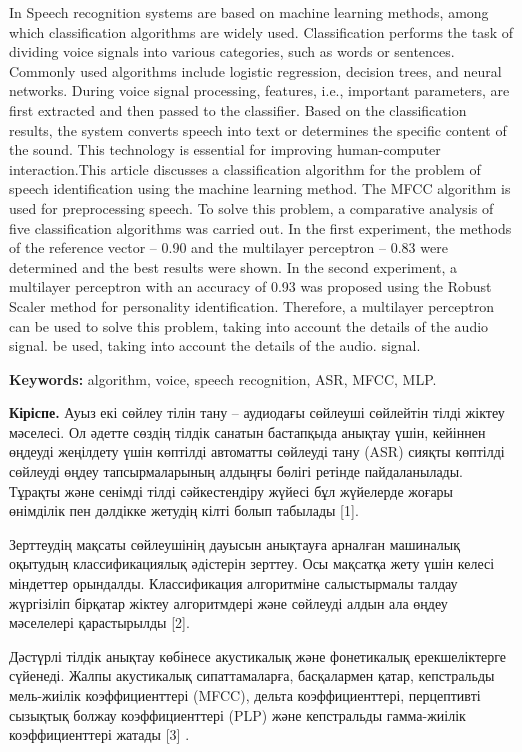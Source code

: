 In Speech recognition systems are based on machine learning methods,
among which classification algorithms are widely used. Classification
performs the task of dividing voice signals into various categories,
such as words or sentences. Commonly used algorithms include logistic
regression, decision trees, and neural networks. During voice signal
processing, features, i.e., important parameters, are first extracted
and then passed to the classifier. Based on the classification results,
the system converts speech into text or determines the specific content
of the sound. This technology is essential for improving human-computer
interaction.This article discusses a classification algorithm for the
problem of speech identification using the machine learning method. The
MFCC algorithm is used for preprocessing speech. To solve this problem,
a comparative analysis of five classification algorithms was carried
out. In the first experiment, the methods of the reference vector --
0.90 and the multilayer perceptron -- 0.83 were determined and the best
results were shown. In the second experiment, a multilayer perceptron
with an accuracy of 0.93 was proposed using the Robust Scaler method for
personality identification. Therefore, a multilayer perceptron can be
used to solve this problem, taking into account the details of the audio
signal. be used, taking into account the details of the audio. signal.

{\bfseries Keywords:} algorithm, voice, speech recognition, ASR, MFCC, MLP.

{\bfseries Кіріспе.} Ауыз екі сөйлеу тілін тану -- аудиодағы сөйлеуші
сөйлейтін тілді жіктеу мәселесі. Ол әдетте сөздің тілдік санатын
бастапқыда анықтау үшін, кейіннен өңдеуді жеңілдету үшін көптілді
автоматты сөйлеуді тану (ASR) сияқты көптілді сөйлеуді өңдеу
тапсырмаларының алдыңғы бөлігі ретінде пайдаланылады. Тұрақты және
сенімді тілді сәйкестендіру жүйесі бұл жүйелерде жоғары өнімділік пен
дәлдікке жетудің кілті болып табылады {[}1{]}.

Зерттеудің мақсаты сөйлеушінің дауысын анықтауға арналған машиналық
оқытудың классификациялық әдістерін зерттеу. Осы мақсатқа жету үшін
келесі міндеттер орындалды. Классификация алгоритміне салыстырмалы
талдау жүргізіліп бірқатар жіктеу алгоритмдері және сөйлеуді алдын ала
өңдеу мәселелері қарастырылды {[}2{]}.

Дәстүрлі тілдік анықтау көбінесе акустикалық және фонетикалық
ерекшеліктерге сүйенеді. Жалпы акустикалық сипаттамаларға, басқалармен
қатар, кепстральды мель-жиілік коэффициенттері (MFCC), дельта
коэффициенттері, перцептивті сызықтық болжау коэффициенттері (PLP) және
кепстральды гамма-жиілік коэффициенттері жатады {[}3{]} .

